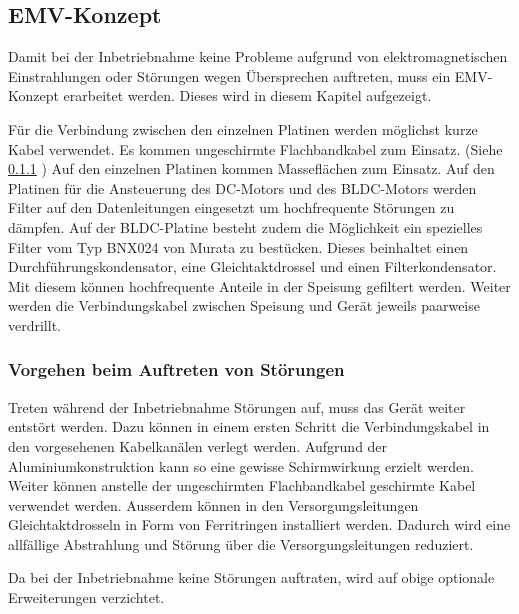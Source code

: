 \subsection{EMV-Konzept}
\label{sec:e_emv}
Damit bei der Inbetriebnahme keine Probleme aufgrund von elektromagnetischen 
Einstrahlungen oder Störungen wegen Übersprechen auftreten, muss ein 
EMV-Konzept erarbeitet werden. Dieses wird in diesem Kapitel aufgezeigt. 

\noindent Für die Verbindung zwischen den einzelnen Platinen werden möglichst 
kurze Kabel verwendet. Es kommen ungeschirmte Flachbandkabel zum Einsatz. 
(Siehe \ref{sec:e_emv_opt} ) Auf den einzelnen Platinen 
kommen Masseflächen zum Einsatz. Auf den Platinen für die Ansteuerung des 
DC-Motors und des BLDC-Motors werden Filter auf den Datenleitungen eingesetzt 
um hochfrequente Störungen zu dämpfen. Auf der BLDC-Platine besteht zudem die 
Möglichkeit ein spezielles Filter vom Typ BNX024 von Murata zu bestücken. 
Dieses beinhaltet einen Durchführungskondensator, eine Gleichtaktdrossel und 
einen Filterkondensator. Mit diesem können hochfrequente Anteile in der 
Speisung gefiltert werden. Weiter werden die Verbindungskabel zwischen 
Speisung und Gerät jeweils paarweise verdrillt. 

\subsubsection{Vorgehen beim Auftreten von Störungen}
\label{sec:e_emv_opt}
Treten während der Inbetriebnahme Störungen auf, muss das Gerät weiter 
entstört werden. Dazu können in einem ersten Schritt die Verbindungskabel in 
den vorgesehenen Kabelkanälen verlegt werden. Aufgrund der 
Aluminiumkonstruktion kann so eine gewisse Schirmwirkung erzielt werden. 
Weiter können anstelle der ungeschirmten Flachbandkabel geschirmte Kabel 
verwendet werden.  Ausserdem können in den Versorgungsleitungen 
Gleichtaktdrosseln in Form von Ferritringen installiert werden. Dadurch wird 
eine allfällige Abstrahlung und Störung über die Versorgungsleitungen 
reduziert. 

\noindent Da bei der Inbetriebnahme keine Störungen auftraten, wird auf obige 
optionale Erweiterungen verzichtet. 
